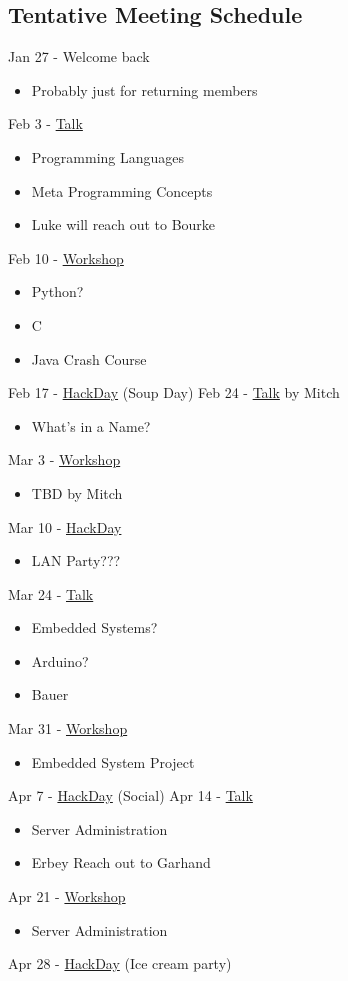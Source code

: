 \subsection{Tentative Meeting Schedule}
Jan 27 - Welcome back 
\begin{itemize}
    \item Probably just for returning members
\end{itemize}
Feb 3 - \underline{Talk}
\begin{itemize}
    \item Programming Languages
    \item Meta Programming Concepts
    \item Luke will reach out to Bourke
\end{itemize}
Feb 10 - \underline{Workshop}
\begin{itemize}
    \item Python?
    \item C
    \item Java Crash Course
\end{itemize}
Feb 17 - \underline{HackDay} (Soup Day)
Feb 24 - \underline{Talk} by Mitch
\begin{itemize}
    \item What's in a Name?
\end{itemize}
Mar 3 - \underline{Workshop}
\begin{itemize}
    \item TBD by Mitch
\end{itemize}
Mar 10 - \underline{HackDay}
\begin{itemize}
    \item LAN Party???
\end{itemize}
Mar 24 - \underline{Talk}
\begin{itemize}
    \item Embedded Systems?
    \item Arduino?
    \item Bauer
\end{itemize}
Mar 31 - \underline{Workshop} 
\begin{itemize}
    \item Embedded System Project
\end{itemize}
Apr 7 - \underline{HackDay} (Social)
Apr 14 - \underline{Talk}
\begin{itemize}
    \item Server Administration
    \item Erbey Reach out to Garhand
\end{itemize}
Apr 21 - \underline{Workshop} 
\begin{itemize}
    \item Server Administration
\end{itemize}
Apr 28 - \underline{HackDay} (Ice cream party)